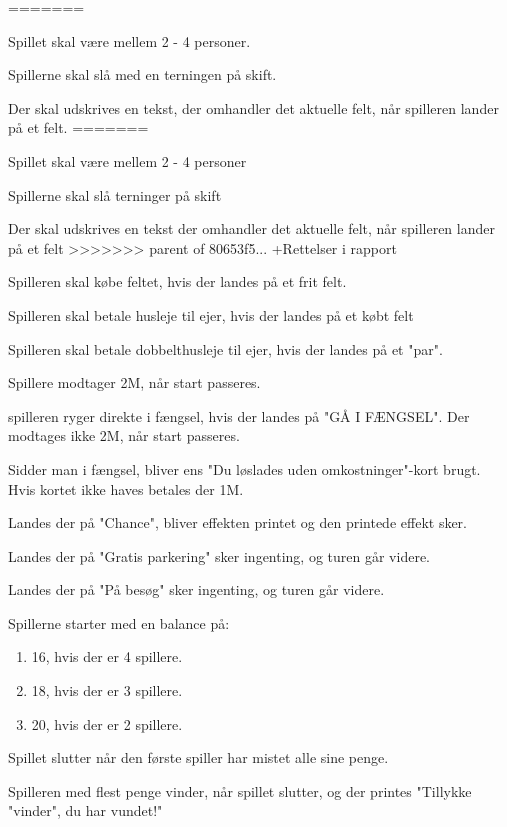 =======
            \item Spillet skal være mellem 2 - 4 personer.
            \item Spillerne skal slå med en terningen på skift.
            \item Der skal udskrives en tekst, der omhandler det aktuelle felt, når spilleren lander på et felt.
=======
            \item Spillet skal være mellem 2 - 4 personer
            \item Spillerne skal slå terninger på skift
            \item Der skal udskrives en tekst der omhandler det aktuelle felt, når spilleren lander på et felt
>>>>>>> parent of 80653f5... +Rettelser i rapport
            \item Spilleren skal købe feltet, hvis der landes på et frit felt.
            \item Spilleren skal betale husleje til ejer, hvis der landes på et købt felt
            \item Spilleren skal betale dobbelthusleje til ejer, hvis der landes på et "par".
            \item Spillere modtager 2M, når start passeres.
            \item spilleren ryger direkte i fængsel, hvis der landes på "GÅ I FÆNGSEL". Der modtages ikke 2M, når start passeres.
            \item Sidder man i fængsel, bliver ens "Du løslades uden omkostninger"-kort brugt. Hvis kortet ikke haves betales der 1M.
            \item Landes der på "Chance", bliver effekten printet og den printede effekt sker.
            \item Landes der på "Gratis parkering" sker ingenting, og turen går videre.
            \item Landes der på "På besøg" sker ingenting, og turen går videre.

            \item Spillerne starter med en balance på:
            \begin{enumerate}
                \item 16, hvis der er 4 spillere.
                \item 18, hvis der er 3 spillere.
                \item 20, hvis der er 2 spillere.
            \end{enumerate}
            \item Spillet slutter når den første spiller har mistet alle sine penge.
            \item Spilleren med flest penge vinder, når spillet slutter, og der printes "Tillykke "vinder", du har vundet!"

